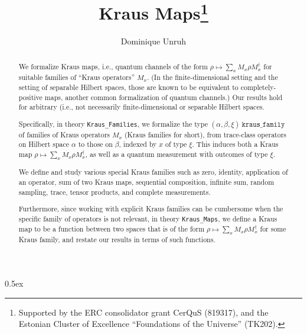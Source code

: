 \documentclass[11pt,a4paper]{article}
\begin{document}
\title{Kraus Maps\thanks{Supported by the ERC consolidator grant CerQuS (819317), and the Estonian Cluster of Excellence ``Foundations of the Universe'' (TK202).}}
\author{Dominique Unruh}
\maketitle

\begin{abstract}
  We formalize Kraus maps, i.e., quantum channels of the form $\rho\mapsto\sum_x M_x\rho M_x^\dagger$ for suitable families of ``Kraus operators'' $M_x$.
  (In the finite-dimensional setting and the setting of separable Hilbert spaces,
  those are known to be equivalent to completely-positive maps, another common formalization of quantum channels.)
  Our results hold for arbitrary (i.e., not necessarily finite-dimensional or separable Hilbert spaces.

  Specifically, in theory \texttt{Kraus\_Families}, we formalize the type $(\alpha,\beta,\xi)\ \mathtt{kraus\_family}$ of families of Kraus operators $M_x$ (Kraus families for short),
  from trace-class operators on Hilbert space $\alpha$ to those on $\beta$, indexed by $x$ of type $\xi$.
  This induces both a Kraus map $\rho\mapsto\sum_x M_x\rho M_x^\dagger$, as well as a quantum measurement with outcomes of type $\xi$.

  We define and study various special Kraus families such as zero,
  identity, application of an operator, sum of two Kraus maps,
  sequential composition, infinite sum, random sampling, trace, tensor
  products, and complete measurements.

  Furthermore, since working with explicit Kraus families can be
  cumbersome when the specific family of operators is not relevant, in
  theory \texttt{Kraus\_Maps}, we define a Kraus map to be a function
  between two spaces that is of the form
  $\rho\mapsto\sum_x M_x\rho M_x^\dagger$ for some Kraus family, and
  restate our results in terms of such functions.  
\end{abstract}

\tableofcontents

\parindent 0pt\parskip 0.5ex





\end{document}
